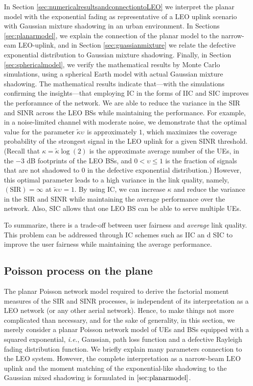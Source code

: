 \documentclass[lettersize,journal]{IEEEtran}
\begin{document}
In Section \ref{sec:numericalresultsandconnectiontoLEO} we interpret the planar model with the exponential fading as representative of a LEO uplink scenario with Gaussian mixture shadowing in an urban environment. In Sections \ref{sec:planarmodel}, we explain the connection of the planar model to the narrow-eam LEO-uplink, and in Section \ref{sec:guassianmixture} we relate the defective exponential distribution to Gaussian mixture shadowing. Finally, in Section \ref{sec:sphericalmodel}, we verify the mathematical results by Monte Carlo simulations, using a spherical Earth model with actual Gaussian mixture shadowing. The mathematical results indicate that---with the simulations confirming the insights---that employing IC in the forms of IIC and SIC improves the perforamnce of the network. We are able to reduce the variance in the SIR and SINR across the LEO BSs while maintaining the performance. For example, in a noise-limited channel with moderate noise, we demonstrate that the optimal value for the parameter $\tilde{\kappa} \upsilon_{}$ is approximately $1$, which maximizes the coverage probability of the strongest signal in the LEO uplink for a given SINR threshold. (Recall that $\kappa=\tilde{\kappa} \log(2)$ is the approximate average number of the UEs, in the $-3$ dB footprints of the LEO BSs, and $0<\upsilon \leq 1$ is the fraction of signals that are not shadowed to $0$ in the defective exponential distribution.) However, this optimal parameter leads to a high variance in the link quality, namely, $(\text{SIR})=\infty$ at $\tilde{\kappa} \upsilon_{}=1$. By using IC, we can increase $\kappa$ and reduce the variance in the SIR and SINR while maintaining the average performance over the network. Also, SIC allows that one LEO BS can be able to serve multiple UEs.

To summarize, there is a trade-off between user fairness and \textit{average} link quality. This problem can be addressed through IC schemes such as IIC an
d SIC to improve the user fairness while maintaining the average performance.




\subsection{Poisson process on the plane}
\label{sec:gainprocess}

The planar Poisson network model required to derive the factorial moment measures of the SIR and SINR processes, is independent of its interpretation as a LEO network (or any other aerial network). Hence, to make things not more complicated than necessary, and for the sake of generality, in this section, we merely consider a planar Poisson network model of UEs and BSs equipped with a squared exponential, \textit{i.e.}, Gaussian, path loss function and a defective Rayleigh fading distribution function. We briefly explain many parameters connection to the LEO system. However, the complete interpretation as a narrow-beam LEO uplink and the moment matching of the exponential-like shadowing to the Gaussian mixed shadowing  is formulated  in $\ref{sec:planarmodel}$.
\end{document}
